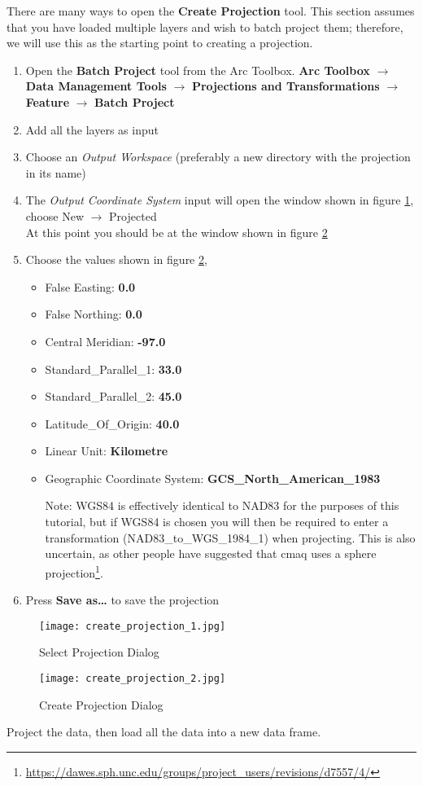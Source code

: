 There are many ways to open the \textbf{Create Projection} tool.  This section assumes that you have loaded multiple layers and wish to batch project them; therefore, we will use this as the starting point to creating a projection.

\begin{enumerate}
	\item Open the \textbf{Batch Project} tool from the Arc Toolbox.  \textbf{Arc Toolbox} $\rightarrow$ \textbf{Data Management Tools} $\rightarrow$ \textbf{Projections and Transformations} $\rightarrow$ \textbf{Feature} $\rightarrow$ \textbf{Batch Project}
	\item Add all the layers as input
	\item Choose an \emph{Output Workspace} (preferably a new directory with the projection in its name)
	\item The \emph{Output Coordinate System} input will open the window shown in figure \ref{create_proj_1}, choose New $\rightarrow$ Projected \\
	At this point you should be at the window shown in figure \ref{create_proj_2}
	\item Choose the values shown in figure \ref{create_proj_2}, \ie \begin{itemize}
		\item False Easting: \textbf{0.0}
		\item False Northing: \textbf{0.0}
		\item Central Meridian: \textbf{-97.0}
		\item Standard\_Parallel\_1: \textbf{33.0}
		\item Standard\_Parallel\_2: \textbf{45.0}
		\item Latitude\_Of\_Origin: \textbf{40.0}
		\item Linear Unit: \textbf{Kilometre}
		\item Geographic Coordinate System: \textbf{GCS\_North\_American\_1983} \\
		\item[Note:]  WGS84 is effectively identical to NAD83 for the purposes of this tutorial, but if WGS84 is chosen you will then be required to enter a transformation (NAD83\_to\_WGS\_1984\_1) when projecting.  This is also uncertain, as other people have suggested that \acs{cmaq} uses a sphere projection\footnote{\url{https://dawes.sph.unc.edu/groups/project\_users/revisions/d7557/4/}}.
	\end{itemize}
	\item Press \textbf{Save as\ldots} to save the projection
\end{enumerate}

\begin{figure}
	\centering
	\texttt{[image: create\_projection\_1.jpg]}
	\caption{Select Projection Dialog}
	\label{create_proj_1}
\end{figure}

\begin{figure}
	\centering
	\texttt{[image: create\_projection\_2.jpg]}
	\caption{Create Projection Dialog}
	\label{create_proj_2}
\end{figure}

Project the data, then load all the data into a new data frame.


